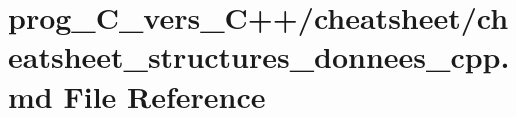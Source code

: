 \hypertarget{prog__C__vers__C_09_09_2cheatsheet_2cheatsheet__structures__donnees__cpp_8md}{}\section{prog\+\_\+\+C\+\_\+vers\+\_\+\+C++/cheatsheet/cheatsheet\+\_\+structures\+\_\+donnees\+\_\+cpp.md File Reference}
\label{prog__C__vers__C_09_09_2cheatsheet_2cheatsheet__structures__donnees__cpp_8md}
